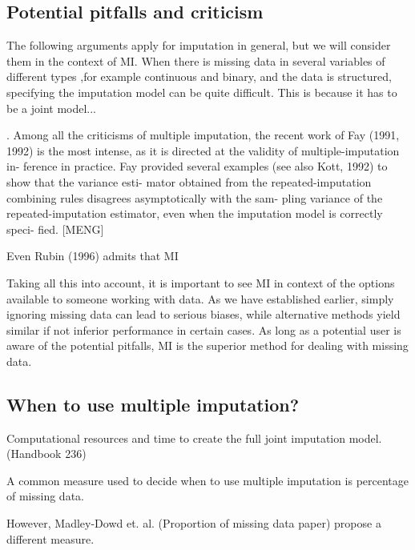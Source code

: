 \documentclass{article}
\begin{document}
	\subsection{Potential pitfalls and criticism}
	The following arguments apply for imputation in general, but we will consider them in the context of MI. When there is missing data in several variables of different types ,for example continuous and binary, and the data is structured, specifying the imputation model can be quite difficult. This is because it has to be a joint model...
	
	
	. Among all the
	criticisms of multiple imputation, the recent work
	of Fay (1991, 1992) is the most intense, as it is
	directed at the validity of multiple-imputation in-
	ference in practice. Fay provided several examples
	(see also Kott, 1992) to show that the variance esti-
	mator obtained from the repeated-imputation combining rules disagrees asymptotically with the sam-
	pling variance of the repeated-imputation estimator,
	even when the imputation model is correctly speci-
	fied. [MENG]
	
	
	
	Even Rubin (1996) admits that MI
	
	Taking all this into account, it is important to see MI in context of the options available to someone working with data. As we have established earlier, simply ignoring missing data can lead  to serious biases, while alternative methods yield similar if not inferior performance in certain cases. As long as a potential user is aware of the potential pitfalls, MI is the superior method for dealing with missing data.
	
	
	\subsection{When to use multiple imputation?}
	Computational resources and time to create the full joint imputation model. (Handbook 236)
	
	A common measure used to decide when to use multiple imputation is percentage of missing data.
	
	However, Madley-Dowd et. al. (Proportion of missing data paper) propose a different measure.
	
\end{document}
